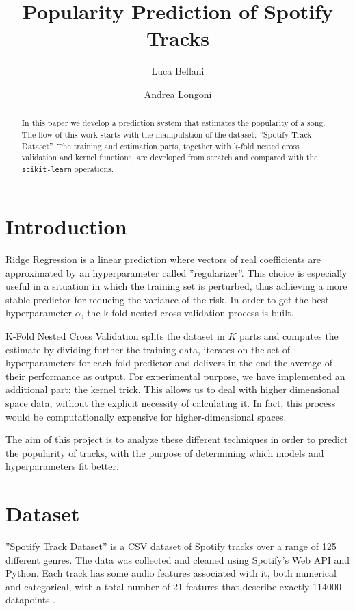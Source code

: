 \documentclass{article}
\begin{document}
\title{\textbf{Popularity Prediction of Spotify Tracks}}
\author{Luca Bellani}
\author{Andrea Longoni}
\date{}

\maketitle


\begin{abstract}
	In this paper we develop a prediction system that estimates the popularity of a song. The flow of this work starts with the manipulation of the dataset: ''Spotify Track Dataset''. The training and estimation parts, together with k-fold nested cross validation and kernel functions, are developed from scratch and compared with the \texttt{scikit-learn} operations. 
\end{abstract}
    

\section{Introduction}
Ridge Regression is a linear prediction where vectors of real coefficients are approximated by an hyperparameter called ''regularizer''. This choice is especially useful in a situation in which the training set is perturbed, thus achieving a more stable predictor for reducing the variance of the risk. \newline
In order to get the best hyperparameter $\alpha$, the k-fold nested cross validation process is built.

K-Fold Nested Cross Validation splits the dataset in $K$ parts and computes the estimate by dividing further the training data, iterates on the set of hyperparameters for each fold predictor and delivers in the end the average of their performance as output.  
For experimental purpose, we have implemented an additional part: the kernel trick. This allows us to deal with higher dimensional space data, without the explicit necessity of calculating it. In fact, this process would be computationally expensive for higher-dimensional spaces.\newline
    
The aim of this project is to analyze these different techniques in order to predict the popularity of tracks, with the purpose of determining which models and hyperparameters fit better. 
     
    
\section{Dataset}
''Spotify Track Dataset'' is a CSV dataset of Spotify tracks over a range of 125 different genres. The data was collected and cleaned using Spotify's Web API and Python. Each track has some audio features associated with it, both numerical and categorical, with a total number of 21 features that describe exactly 114000 datapoints \cite{datasetKaggle}. 
\end{document}
